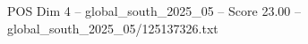 \begin{textsample}{POS Dim 4 – global\_south\_2025\_05 – Score 23.00 – global\_south\_2025\_05/125137326.txt}
\end{textsample}
